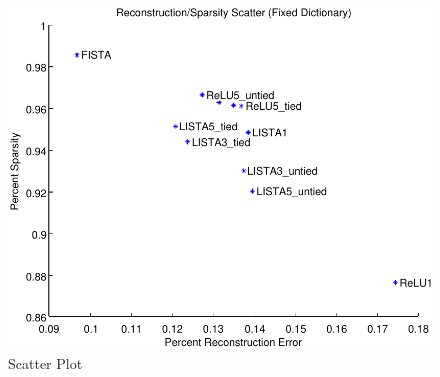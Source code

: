 \begin{figure}
\centering
\includegraphics[scale=0.75]{./figures/LISTA/fixed_decoder_scatter.pdf}
\caption{Scatter Plot} 
\label{fig:scatter_fixed} 
\end{figure}  

